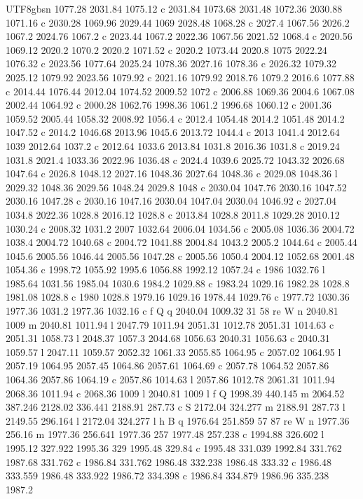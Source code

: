 \documentclass[11pt,a4paper,oneside]{report}
\begin{document}
\begin{CJK*}{UTF8}{gbsn}
{1077.28 2031.84 1075.12 c 2031.84 1073.68 2031.48 1072.36 2030.88 1071.16 c 2030.28 1069.96 2029.44 1069
2028.48 1068.28 c 2027.4 1067.56 2026.2 1067.2 2024.76 1067.2 c 2023.44 1067.2 2022.36 1067.56 2021.52
1068.4 c 2020.56 1069.12 2020.2 1070.2 2020.2 1071.52 c 2020.2 1073.44 2020.8 1075 2022.24 1076.32 c
2023.56 1077.64 2025.24 1078.36 2027.16 1078.36 c 2026.32 1079.32 2025.12 1079.92 2023.56 1079.92 c
2021.16 1079.92 2018.76 1079.2 2016.6 1077.88 c 2014.44 1076.44 2012.04 1074.52 2009.52 1072 c 2006.88
1069.36 2004.6 1067.08 2002.44 1064.92 c 2000.28 1062.76 1998.36 1061.2 1996.68 1060.12 c 2001.36 1059.52
2005.44 1058.32 2008.92 1056.4 c 2012.4 1054.48 2014.2 1051.48 2014.2 1047.52 c 2014.2 1046.68 2013.96
1045.6 2013.72 1044.4 c 2013 1041.4 2012.64 1039 2012.64 1037.2 c 2012.64 1033.6 2013.84 1031.8 2016.36
1031.8 c 2019.24 1031.8 2021.4 1033.36 2022.96 1036.48 c 2024.4 1039.6 2025.72 1043.32 2026.68 1047.64 c
2026.8 1048.12 2027.16 1048.36 2027.64 1048.36 c 2029.08 1048.36 l 2029.32 1048.36 2029.56 1048.24 2029.8
1048 c 2030.04 1047.76 2030.16 1047.52 2030.16 1047.28 c 2030.16 1047.16 2030.04 1047.04 2030.04 1046.92
c 2027.04 1034.8 2022.36 1028.8 2016.12 1028.8 c 2013.84 1028.8 2011.8 1029.28 2010.12 1030.24 c 2008.32
1031.2 2007 1032.64 2006.04 1034.56 c 2005.08 1036.36 2004.72 1038.4 2004.72 1040.68 c 2004.72 1041.88
2004.84 1043.2 2005.2 1044.64 c 2005.44 1045.6 2005.56 1046.44 2005.56 1047.28 c 2005.56 1050.4 2004.12
1052.68 2001.48 1054.36 c 1998.72 1055.92 1995.6 1056.88 1992.12 1057.24 c 1986 1032.76 l 1985.64 1031.56
1985.04 1030.6 1984.2 1029.88 c 1983.24 1029.16 1982.28 1028.8 1981.08 1028.8 c 1980 1028.8 1979.16
1029.16 1978.44 1029.76 c 1977.72 1030.36 1977.36 1031.2 1977.36 1032.16 c f Q q 2040.04 1009.32 31 58 re
W n 2040.81 1009 m 2040.81 1011.94 l 2047.79 1011.94 2051.31 1012.78 2051.31 1014.63 c 2051.31 1058.73 l
2048.37 1057.3 2044.68 1056.63 2040.31 1056.63 c 2040.31 1059.57 l 2047.11 1059.57 2052.32 1061.33
2055.85 1064.95 c 2057.02 1064.95 l 2057.19 1064.95 2057.45 1064.86 2057.61 1064.69 c 2057.78 1064.52
2057.86 1064.36 2057.86 1064.19 c 2057.86 1014.63 l 2057.86 1012.78 2061.31 1011.94 2068.36 1011.94 c
2068.36 1009 l 2040.81 1009 l f Q 1998.39 440.145 m 2064.52 387.246 2128.02 336.441 2188.91 287.73 c S
2172.04 324.277 m 2188.91 287.73 l 2149.55 296.164 l 2172.04 324.277 l h B q 1976.64 251.859 57 87 re W n
1977.36 256.16 m 1977.36 256.641 1977.36 257 1977.48 257.238 c 1994.88 326.602 l 1995.12 327.922 1995.36
329 1995.48 329.84 c 1995.48 331.039 1992.84 331.762 1987.68 331.762 c 1986.84 331.762 1986.48 332.238
1986.48 333.32 c 1986.48 333.559 1986.48 333.922 1986.72 334.398 c 1986.84 334.879 1986.96 335.238 1987.2
}
\end{CJK*}
\end{document}
